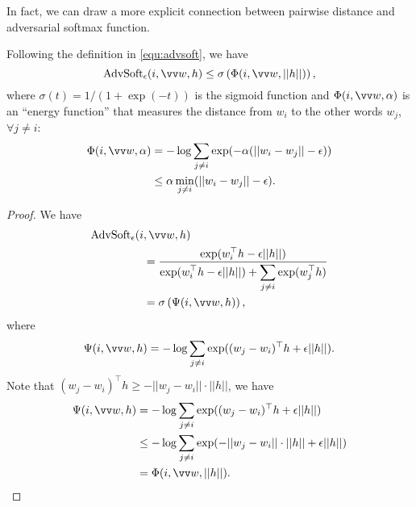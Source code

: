 \documentclass{article}
\newcommand{\ours}{{\mathrm{AdvSoft}}}
\newcommand{\advsoft}{\ours}
\begin{document}
In fact, we can draw a more explicit connection between pairwise distance and adversarial softmax function. \begin{thm} 
Following the definition in \eqref{equ:advsoft}, we have  
$$
\advsoft_\epsilon(i, \vv w, h) 
\leq \sigma \left ( \Phi(i, \vv w, ||h||) \right ), 
$$
where $\sigma(t) = 1/(1+\exp(-t))$ is the sigmoid function and 
$\Phi(i, \vv w, \alpha)$
is an ``energy function''
that measures the distance from $w_i$ to the other words $w_j$, $\forall j\neq i$: 
\begin{align*}
\Phi(i, \vv w, \alpha) 
& = -\log \sum_{j\neq i} \exp(-\alpha (||w_i - w_j|| - \epsilon)) \\
& \leq  \alpha \min_{j\neq i}(||w_i - w_j|| - \epsilon).  
\end{align*}
\label{thm:diversity}
\end{thm}
\vspace{-3em}
\begin{proof}
We have 
\begin{align*}\begin{split}
& {\advsoft}_\epsilon(i, \vv w,h) \\
&~~~~~~~~~~~~~~   = \frac{\displaystyle\exp(w_i^\top h-\epsilon||h||)}{\displaystyle
\exp(w_i^\top h-\epsilon||h||) + \sum_{j\neq i} \exp(w_j^\top h)}\\
&~~~~~~~~~~~~~~   =
\sigma\left (\Psi(i, \vv w, h)\right),
\end{split}
\end{align*}
where 
$$
\Psi(i, \vv w, h)
= -\log \sum_{j\neq i}
\exp((w_j-w_i)^\top h + \epsilon ||h||).
$$
Note that $(w_j-w_i)^\top h \geq -||w_j-w_i|| \cdot ||h||$, we have
\begin{align*}
\Psi(i, \vv w, h)
& = -\log \sum_{j\neq i}
\exp((w_j-w_i)^\top h + \epsilon ||h||) \\
& \leq 
 -\log \sum_{j\neq i}
\exp(-||w_j-w_i||\cdot||h|| + \epsilon ||h||) \\
& = \Phi(i,\vv w, ||h||). 
\end{align*}
\vspace{-1.0em}
\iffalse 
Assume $\advsoft_\epsilon(w_i, W, h) = p$, we have 
$$
w_i^\top h - \epsilon ||h|| - \log \sum_{j\neq i} \exp(w_j^\top h) = \log (p/(1-p)).
$$
This is equivalent to 
$$
\log \sum_{j \neq i} \exp((w_j- w_i)^\top h + \epsilon ||h||) = \log ((1-p)/p). 
$$
Further
$$
\log \sum_{j \neq i} \exp(-||w_j- w_i||||h|| + \epsilon ||h||) \leq \log ((1-p)/p). 
$$
Define $\alpha = ||h||$. We have 
$$
\log \sum_{j \neq i} \exp(\alphya(\epsilon-||w_j- w_i||) \leq \log ((1-p)/p). 
$$
This shows that 
$$
\min_{j\neq i}||w_j- w_i||  \geq \epsilon + 
\frac{1}{||h||}\log (p/(1-p)). 
$$
\fi 
\end{proof}
\vspace{-0.5em}
\end{document}
